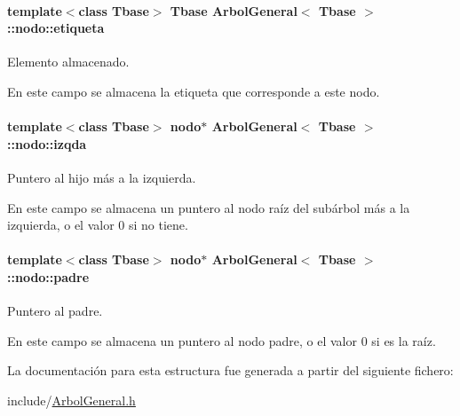 \paragraph[{\texorpdfstring{etiqueta}{etiqueta}}]{\setlength{\rightskip}{0pt plus 5cm}template$<$class Tbase$>$ Tbase {\bf Arbol\+General}$<$ Tbase $>$\+::nodo\+::etiqueta}\hypertarget{structArbolGeneral_1_1nodo_ab7223965c5a62aa93895f3decd7a109a}{}\label{structArbolGeneral_1_1nodo_ab7223965c5a62aa93895f3decd7a109a}


Elemento almacenado. 

En este campo se almacena la etiqueta que corresponde a este nodo. 
\paragraph[{\texorpdfstring{izqda}{izqda}}]{\setlength{\rightskip}{0pt plus 5cm}template$<$class Tbase$>$ {\bf nodo}$\ast$ {\bf Arbol\+General}$<$ Tbase $>$\+::nodo\+::izqda}\hypertarget{structArbolGeneral_1_1nodo_a3b8075b9fd0dc27c2272ba48bd9a9221}{}\label{structArbolGeneral_1_1nodo_a3b8075b9fd0dc27c2272ba48bd9a9221}


Puntero al hijo más a la izquierda. 

En este campo se almacena un puntero al nodo raíz del subárbol más a la izquierda, o el valor 0 si no tiene. 
\paragraph[{\texorpdfstring{padre}{padre}}]{\setlength{\rightskip}{0pt plus 5cm}template$<$class Tbase$>$ {\bf nodo}$\ast$ {\bf Arbol\+General}$<$ Tbase $>$\+::nodo\+::padre}\hypertarget{structArbolGeneral_1_1nodo_ab4d70a0179e8450b2842bbf1a6481402}{}\label{structArbolGeneral_1_1nodo_ab4d70a0179e8450b2842bbf1a6481402}


Puntero al padre. 

En este campo se almacena un puntero al nodo padre, o el valor 0 si es la raíz. 

La documentación para esta estructura fue generada a partir del siguiente fichero\+:\begin{DoxyCompactItemize}
\item 
include/\hyperlink{ArbolGeneral_8h}{Arbol\+General.\+h}\end{DoxyCompactItemize}
